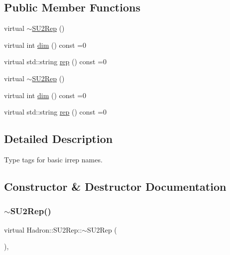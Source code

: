 \subsection*{Public Member Functions}
\begin{DoxyCompactItemize}
\item 
virtual \mbox{\hyperlink{structHadron_1_1SU2Rep_a48791a8dcceacd9a2a4cc08788603a52}{$\sim$\+S\+U2\+Rep}} ()
\item 
virtual int \mbox{\hyperlink{structHadron_1_1SU2Rep_a4feae466a054ad829ef37a71b46667b8}{dim}} () const =0
\item 
virtual std\+::string \mbox{\hyperlink{structHadron_1_1SU2Rep_a97c63ec12042453d3ac8e9ea612b2743}{rep}} () const =0
\item 
virtual \mbox{\hyperlink{structHadron_1_1SU2Rep_a48791a8dcceacd9a2a4cc08788603a52}{$\sim$\+S\+U2\+Rep}} ()
\item 
virtual int \mbox{\hyperlink{structHadron_1_1SU2Rep_a4feae466a054ad829ef37a71b46667b8}{dim}} () const =0
\item 
virtual std\+::string \mbox{\hyperlink{structHadron_1_1SU2Rep_a97c63ec12042453d3ac8e9ea612b2743}{rep}} () const =0
\end{DoxyCompactItemize}


\subsection{Detailed Description}
Type tags for basic irrep names. 

\subsection{Constructor \& Destructor Documentation}
\mbox{\label{structHadron_1_1SU2Rep_a48791a8dcceacd9a2a4cc08788603a52}} 
\subsubsection{\texorpdfstring{$\sim$SU2Rep()}{~SU2Rep()}\hspace{0.1cm}{\footnotesize\ttfamily [1/2]}}
{\footnotesize\ttfamily virtual Hadron\+::\+S\+U2\+Rep\+::$\sim$\+S\+U2\+Rep (\begin{DoxyParamCaption}{ }\end{DoxyParamCaption})\hspace{0.3cm}{\ttfamily [inline]}, {\ttfamily [virtual]}}

